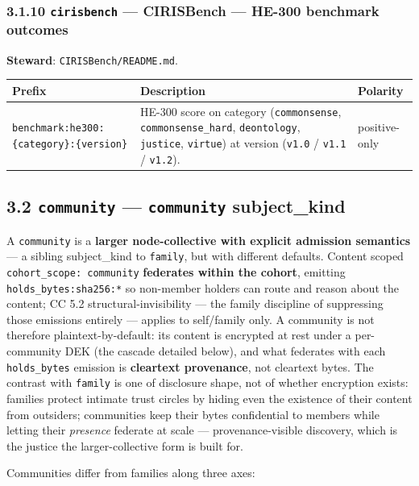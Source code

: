 \documentclass[11pt]{article}
\begin{document}
\subsubsection*{3.1.10 \texttt{cirisbench} — CIRISBench — HE-300 benchmark outcomes}


\textbf{Steward}: \texttt{CIRISBench/README.md}.


{\footnotesize
\begin{longtable}{|p{5.33cm}|p{5.33cm}|p{5.33cm}|}\hline
\textbf{Prefix} & \textbf{Description} & \textbf{Polarity} \\ \hline\endhead
\texttt{benchmark:he300:\{category\}:\{version\}} & HE-300 score on category (\texttt{commonsense}, \texttt{commonsense\_hard}, \texttt{deontology}, \texttt{justice}, \texttt{virtue}) at version (\texttt{v1.0} / \texttt{v1.1} / \texttt{v1.2}). & positive-only \\ \hline
\end{longtable}}


\subsection*{3.2 \texttt{community} — \texttt{community} subject\_kind}


A \texttt{community} is a \textbf{larger node-collective with explicit admission semantics} — a sibling subject\_kind to \texttt{family}, but with different defaults. Content scoped \texttt{cohort\_scope: community} \textbf{federates within the cohort}, emitting \texttt{holds\_bytes:sha256:*} so non-member holders can route and reason about the content; CC 5.2 structural-invisibility — the family discipline of suppressing those emissions entirely — applies to self/family only. A community is not therefore plaintext-by-default: its content is encrypted at rest under a per-community DEK (the cascade detailed below), and what federates with each \texttt{holds\_bytes} emission is \textbf{cleartext provenance}, not cleartext bytes. The contrast with \texttt{family} is one of disclosure shape, not of whether encryption exists: families protect intimate trust circles by hiding even the existence of their content from outsiders; communities keep their bytes confidential to members while letting their \textit{presence} federate at scale — provenance-visible discovery, which is the justice the larger-collective form is built for.


Communities differ from families along three axes:
\end{document}
